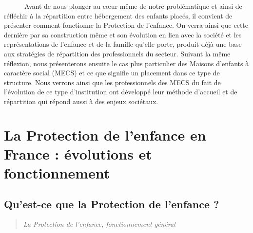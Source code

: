 \documentclass[
  12,
  a4paper,
]{report}
\begin{document}
~~~~~~Avant de nous plonger au cœur même de notre problématique et ainsi
de réfléchir à la répartition entre hébergement des enfants placés, il
convient de présenter comment fonctionne la Protection de l'enfance. On
verra ainsi que cette dernière par sa construction même et son évolution
en lien avec la société et les représentations de l'enfance et de la
famille qu'elle porte, produit déjà une base aux stratégies de
répartition des professionnels du secteur. Suivant la même réflexion,
nous présenterons ensuite le cas plus particulier des Maisons d'enfants
à caractère social (MECS) et ce que signifie un placement dans ce type
de structure. Nous verrons ainsi que les professionnels des MECS du fait
de l'évolution de ce type d'institution ont développé leur méthode
d'accueil et de répartition qui répond aussi à des enjeux sociétaux.

\hypertarget{la-protection-de-lenfance-en-france-uxe9volutions-et-fonctionnement}{%
\section{La Protection de l'enfance en France : évolutions et
fonctionnement}\label{la-protection-de-lenfance-en-france-uxe9volutions-et-fonctionnement}}

\hypertarget{quest-ce-que-la-protection-de-lenfance}{%
\subsection{Qu'est-ce que la Protection de l'enfance
?}\label{quest-ce-que-la-protection-de-lenfance}}

\begin{quote}
\emph{La Protection de l'enfance, fonctionnement général}
\end{quote}
\end{document}
